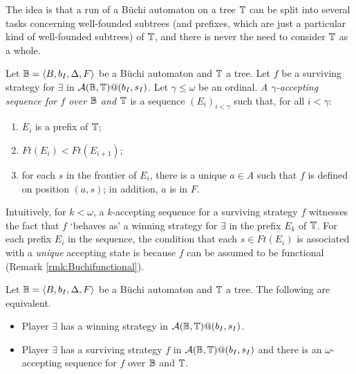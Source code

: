 The idea is that a run of a B\"{u}chi automaton on a tree $\mathbb{T}$ can be split into several tasks concerning well-founded subtrees (and prefixes, which are just a particular kind of well-founded subtrees) of $\mathbb{T}$, and there is never the need to consider $\mathbb{T}$ as a whole. %

\begin{definition}\label{DEF_accepting_sequence}
Let $\mathbb{B} = \langle B,b_I,\Delta,F\rangle$ be a B\"{u}chi automaton and $\mathbb{T}$ a tree. Let $f$ be a surviving strategy for $\exists$ in $\mathcal{A}(\mathbb{B},\mathbb{T})@(b_I,s_I)$. Let $\gamma \leq \omega$ be an ordinal. \emph{A $\gamma$-accepting sequence for $f$ over $\mathbb{B}$ and $\mathbb{T}$} is a sequence $(E_i)_{i < \gamma}$ such that, for all $i < \gamma$:
\begin{enumerate}
\item $E_i$ is a prefix of $\mathbb{T}$;
\item $\mathit{Ft}(E_i) < \mathit{Ft}(E_{i+1})$;
\item for each $s$ in the frontier of $E_i$, there is a unique $a\in A$ such
   that $f$ is defined on position $(a,s)$; in addition, $a$ is in $F$.
\end{enumerate}
\end{definition}

Intuitively, for $k <\omega$, a $k$-accepting sequence for a surviving strategy
$f$ witnesses the fact that $f$ `behaves as' a winning strategy for $\exists$
in the prefix $E_k$ of $\mathbb{T}$. For each prefix $E_i$ in the sequence, the
condition that each $s \in \mathit{Ft}(E_i)$ is associated with a \emph{unique}
accepting state is because $f$ can be assumed to be
functional (Remark \ref{rmk:Buchifunctional}).

\begin{proposition}\label{PROP_Buchi_finite_segments}
Let $\mathbb{B} = \langle B,b_I,\Delta,F\rangle$ be a B\"{u}chi automaton and $\mathbb{T}$ a tree. The following are equivalent.
\begin{itemize}
  \item Player $\exists$ has a winning strategy in $\mathcal{A}(\mathbb{B},\mathbb{T})@(b_I,s_I)$.
  \item Player $\exists$ has a surviving strategy $f$ in $\mathcal{A}(\mathbb{B},\mathbb{T})@(b_I,s_I)$ and there is an $\omega$-accepting sequence for $f$ over $\mathbb{B}$ and $\mathbb{T}$.
\end{itemize}
\end{proposition}

